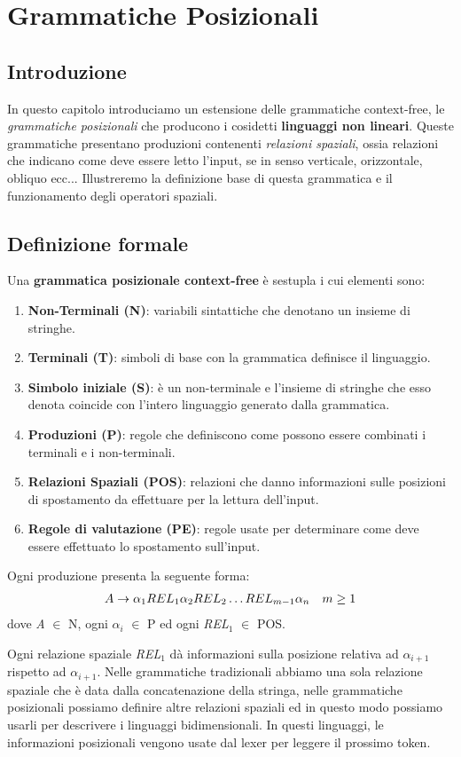 \chapter{Grammatiche Posizionali}
\section{Introduzione}
In questo capitolo introduciamo un estensione delle grammatiche context-free, le \textit{grammatiche posizionali} che producono i cosidetti \textbf{linguaggi non lineari}. Queste grammatiche presentano produzioni contenenti \textit{relazioni spaziali}, ossia relazioni che indicano come deve essere letto l'input, se in senso verticale, orizzontale, obliquo ecc... Illustreremo la definizione base di questa grammatica e il funzionamento degli operatori spaziali.
\section{Definizione formale}
Una \textbf{grammatica posizionale context-free} è sestupla \cite{pubblicazione: tomita} i cui elementi sono:
\begin{enumerate}
	\item \textbf{Non-Terminali (N)}: variabili sintattiche che denotano un insieme di stringhe.
	\item \textbf{Terminali (T)}: simboli di base con la grammatica definisce il linguaggio.
	\item \textbf{Simbolo iniziale (S)}: è un non-terminale e l'insieme di stringhe che esso denota coincide con l'intero linguaggio generato dalla grammatica.
	\item \textbf{Produzioni (P)}: regole che definiscono come possono essere combinati i terminali e i non-terminali.
	\item \textbf{Relazioni Spaziali (POS)}: relazioni che danno informazioni sulle posizioni di spostamento da effettuare per la lettura dell'input.
	\item \textbf{Regole di valutazione (PE)}: regole usate per determinare come deve essere effettuato lo spostamento sull'input.
\end{enumerate}
Ogni produzione presenta la seguente forma:
\begin{align}
	A \to \alpha_{1} REL_1 \alpha_{2} REL_2 \dots REL_{m-1} \alpha_{n} \quad m \ge 1 \notag 
\end{align}
dove \textit{A} $\in$ N, ogni $\alpha_i$ $\in$ P ed ogni \textit{REL}$_1$ $\in$ POS.\par
\vspace{0.3cm}
\noindent Ogni relazione spaziale \textit{REL}$_1$ dà informazioni sulla posizione relativa ad $\alpha_{i+1}$ rispetto ad $\alpha_{i+1}$. Nelle grammatiche tradizionali abbiamo una sola relazione spaziale che è data dalla concatenazione della stringa, nelle grammatiche posizionali possiamo definire altre relazioni spaziali ed in questo modo possiamo usarli per descrivere i linguaggi bidimensionali. In questi linguaggi, le informazioni posizionali vengono usate dal lexer per leggere il prossimo token.
